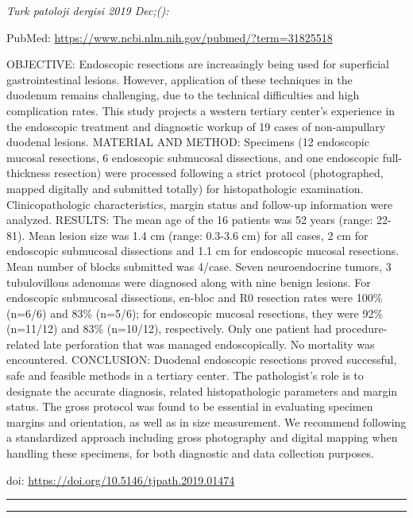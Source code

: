 \documentclass[
]{article}
\renewcommand{\linethickness}{0.05em}
\begin{document}
\emph{Turk patoloji dergisi 2019 Dec;():}

PubMed: \url{https://www.ncbi.nlm.nih.gov/pubmed/?term=31825518}

OBJECTIVE: Endoscopic resections are increasingly being used for
superficial gastrointestinal lesions. However, application of these
techniques in the duodenum remains challenging, due to the technical
difficulties and high complication rates. This study projects a western
tertiary center's experience in the endoscopic treatment and diagnostic
workup of 19 cases of non-ampullary duodenal lesions. MATERIAL AND
METHOD: Specimens (12 endoscopic mucosal resections, 6 endoscopic
submucosal dissections, and one endoscopic full-thickness resection)
were processed following a strict protocol (photographed, mapped
digitally and submitted totally) for histopathologic examination.
Clinicopathologic characteristics, margin status and follow-up
information were analyzed. RESULTS: The mean age of the 16 patients was
52 years (range: 22-81). Mean lesion size was 1.4 cm (range: 0.3-3.6 cm)
for all cases, 2 cm for endoscopic submucosal dissections and 1.1 cm for
endoscopic mucosal resections. Mean number of blocks submitted was
4/case. Seven neuroendocrine tumors, 3 tubulovillous adenomas were
diagnosed along with nine benign lesions. For endoscopic submucosal
dissections, en-bloc and R0 resection rates were 100\% (n=6/6) and 83\%
(n=5/6); for endoscopic mucosal resections, they were 92\% (n=11/12) and
83\% (n=10/12), respectively. Only one patient had procedure-related
late perforation that was managed endoscopically. No mortality was
encountered. CONCLUSION: Duodenal endoscopic resections proved
successful, safe and feasible methods in a tertiary center. The
pathologist's role is to designate the accurate diagnosis, related
histopathologic parameters and margin status. The gross protocol was
found to be essential in evaluating specimen margins and orientation, as
well as in size measurement. We recommend following a standardized
approach including gross photography and digital mapping when handling
these specimens, for both diagnostic and data collection purposes.

doi: \url{https://doi.org/10.5146/tjpath.2019.01474}

\begin{center}\rule{0.5\linewidth}{\linethickness}\end{center}

\begin{center}\rule{0.5\linewidth}{\linethickness}\end{center}
\end{document}
